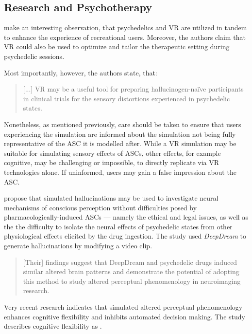 \subsection{Research and Psychotherapy}
\textcite{aday2020psychedelics} make an interesting observation, that psychedelics and VR are utilized in tandem to enhance the experience of recreational users. Moreover, the authors claim that VR could also be used to optimize and tailor the therapeutic setting during psychedelic sessions.

Most importantly, however, the authors state, that:

\begin{quote}
    [...] VR may be a useful tool for preparing hallucinogen-naïve participants in clinical trials for the sensory distortions experienced in psychedelic states.
\end{quote}

Nonetheless, as mentioned previously, care should be taken to ensure that users experiencing the simulation are informed about the simulation not being fully representative of the \ac{ASC} it is modelled after. While a \ac{VR} simulation may be suitable for simulating sensory effects of \acp{ASC}, other effects, for example cognitive, may be challenging or impossible, to directly replicate via \ac{VR} technologies alone. If uninformed, users may gain a false impression about the \ac{ASC}.

\textcite{greco2021increased} propose that simulated hallucinations may be used to investigate neural mechanisms of conscious perception without difficulties posed by pharmacologically-induced \acp{ASC} --- namely the ethical and legal issues, as well as the the difficulty to isolate the neural effects of psychedelic states from other physiological effects elicited by the drug ingestion. The study used \textit{DeepDream} \autocite{mordvintsev2015inceptionism} to generate hallucinations by modifying a video clip.

\begin{quote}
    [Their] findings suggest that DeepDream and psychedelic drugs induced similar altered brain patterns and demonstrate the potential of adopting this method to study altered perceptual phenomenology in neuroimaging research.
\end{quote}

Very recent research \autocite{rastelli2021simulated} indicates that simulated altered perceptual phenomenology enhances cognitive flexibility and inhibits automated decision making. The study describes cognitive flexibility as .

